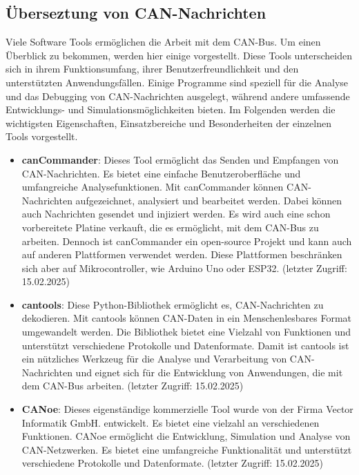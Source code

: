 \subsection{Überseztung von CAN-Nachrichten}
Viele Software Tools ermöglichen die Arbeit mit dem CAN-Bus. Um einen Überblick zu bekommen, 
werden hier einige vorgestellt. Diese Tools unterscheiden sich in ihrem Funktionsumfang, ihrer Benutzerfreundlichkeit 
und den unterstützten Anwendungsfällen. Einige Programme sind speziell für die Analyse und das Debugging von CAN-Nachrichten 
ausgelegt, während andere umfassende Entwicklungs- und Simulationsmöglichkeiten bieten. Im Folgenden werden die wichtigsten 
Eigenschaften, Einsatzbereiche und Besonderheiten der einzelnen Tools vorgestellt. \\
\begin{itemize}
    \item \textbf{canCommander}: Dieses Tool ermöglicht das Senden und Empfangen von CAN-Nachrichten. Es bietet eine einfache 
    Benutzeroberfläche und umfangreiche Analysefunktionen. Mit canCommander können CAN-Nachrichten aufgezeichnet, 
    analysiert und bearbeitet werden. Dabei können auch Nachrichten gesendet und injiziert werden. Es wird auch eine
    schon vorbereitete Platine verkauft, die es ermöglicht, mit dem CAN-Bus zu arbeiten. Dennoch ist canCommander ein
    open-source Projekt und kann auch auf anderen Plattformen verwendet werden. Diese Plattformen beschränken sich aber
    auf Mikrocontroller, wie Arduino Uno oder ESP32. \cite{can_commander} (letzter Zugriff: 15.02.2025)
    \item \textbf{cantools}: Diese Python-Bibliothek ermöglicht es, CAN-Nachrichten zu dekodieren. Mit cantools können 
    CAN-Daten in ein Menschenlesbares Format umgewandelt werden. Die Bibliothek 
    bietet eine Vielzahl von Funktionen und unterstützt verschiedene Protokolle und Datenformate. Damit ist cantools ist ein 
    nützliches Werkzeug für die Analyse und Verarbeitung von CAN-Nachrichten und eignet sich für die Entwicklung von 
    Anwendungen, die mit dem CAN-Bus arbeiten. \cite{cantools} (letzter Zugriff: 15.02.2025)
    \item \textbf{CANoe}: Dieses eigenständige kommerzielle Tool wurde von der Firma Vector Informatik GmbH. entwickelt.
    Es bietet eine vielzahl an verschiedenen Funktionen. CANoe ermöglicht die Entwicklung, Simulation und Analyse von
    CAN-Netzwerken. Es bietet eine umfangreiche Funktionalität und unterstützt verschiedene Protokolle und Datenformate.
    \cite{VectorCANoe} (letzter Zugriff: 15.02.2025)

\end{itemize}
